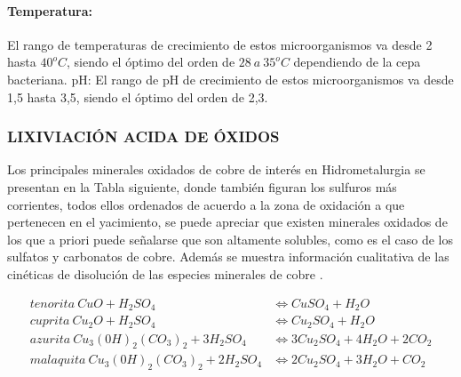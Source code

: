 \paragraph{Temperatura:} El rango de temperaturas de crecimiento de estos microorganismos va desde 2 hasta $40^oC$, siendo el \'optimo del orden de $28\: a\: 35^oC$ dependiendo de la cepa bacteriana. 
pH: El rango de pH de crecimiento de estos microorganismos va desde 1,5 hasta 3,5, siendo el \'optimo del orden de 2,3.

\subsubsection{LIXIVIACI\'ON ACIDA DE \'OXIDOS}

Los principales minerales oxidados de cobre de inter\'es en Hidrometalurgia se presentan en la Tabla siguiente, donde tambi\'en figuran los sulfuros m\'as corrientes, todos ellos ordenados de acuerdo a la zona de oxidaci\'on a que pertenecen en el yacimiento, se puede apreciar que existen minerales oxidados de los que a priori puede se\~nalarse que son altamente solubles, como es el caso de los sulfatos y carbonatos de cobre. Adem\'as se muestra informaci\'on cualitativa de las cin\'eticas de disoluci\'on de las especies minerales de cobre .

\begin{equation}
 \begin{align}
 tenorita\: CuO+H_2SO_4 &\Leftrightarrow CuSO_4+H_2O \\
 cuprita\: Cu_2O+H_2SO_4 &\Leftrightarrow Cu_2SO_4+H_2O \\
 azurita\: Cu_3(0H)_2(CO_3)_2 + 3H_2SO_4 &\Leftrightarrow 3Cu_2SO_4+4H_2O +2CO_2 \\
 malaquita\:Cu_3(0H)_2(CO_3)_2 + 2H_2SO_4 &\Leftrightarrow 2Cu_2SO_4+3H_2O + CO_2
 \end{align}
\end{equation}

